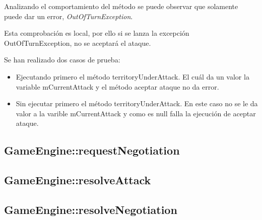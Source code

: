 Analizando el comportamiento del método se puede observar que solamente puede dar un error, \textit{OutOfTurnException}.

Esta comprobación es local, por ello si se lanza la excepción OutOfTurnException, no se aceptará el ataque.

Se han realizado dos casos de prueba:
\begin{itemize}
\item Ejecutando primero el método territoryUnderAttack. El cuál da un valor la variable mCurrentAttack y el método aceptar ataque no da error.
\item Sin ejecutar primero el método territoryUnderAttack. En este caso no se le da valor a la varible mCurrentAttack y como es null falla la ejecución de aceptar ataque.
\end{itemize}

\subsection{GameEngine::requestNegotiation}
\subsection{GameEngine::resolveAttack}
\subsection{GameEngine::resolveNegotiation}

